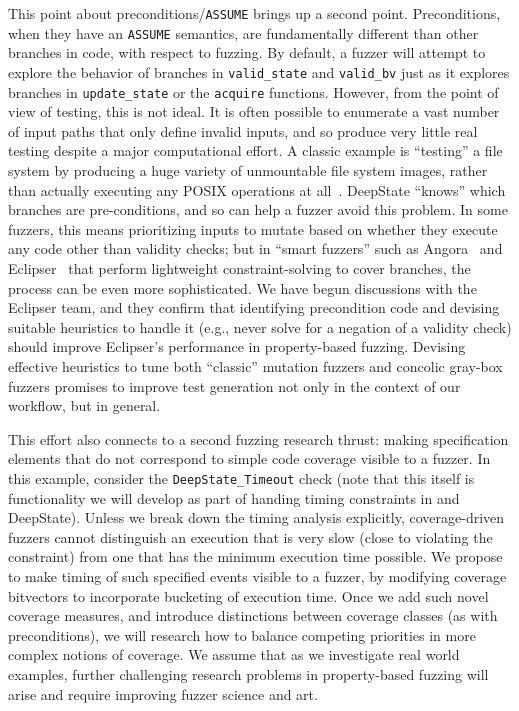   This point about preconditions/{\tt ASSUME} brings up a second point.  Preconditions, when they have an {\tt ASSUME} semantics, are fundamentally different than other branches in code, with respect to fuzzing.  By default, a fuzzer will attempt to explore the behavior of branches in {\tt valid\_state} and {\tt valid\_bv} just as it explores branches in {\tt update\_state} or the {\tt acquire} functions.  However, from the point of view of testing, this is not ideal.  It is often possible to enumerate a vast number of input paths that only define invalid inputs, and so produce very little real testing despite a major computational effort.  A classic example is ``testing'' a file system by producing a huge variety of unmountable file system images, rather than actually executing any POSIX operations at all~\cite{CFV08,AMAI}.  DeepState ``knows'' which branches are pre-conditions, and so can help a fuzzer avoid this problem.  In some fuzzers, this means prioritizing inputs to mutate based on whether they execute any code other than validity checks; but in ``smart fuzzers'' such as Angora~\cite{angora} and Eclipser~\cite{eclipser} that perform lightweight constraint-solving to cover branches, the process can be even more sophisticated.  We have begun discussions with the Eclipser team, and they confirm that identifying precondition code and devising suitable heuristics to handle it (e.g., never solve for a negation of a validity check) should improve Eclipser's performance in property-based fuzzing.  Devising effective heuristics to tune both ``classic'' mutation fuzzers and concolic gray-box fuzzers promises to improve test generation not only in the context of our workflow, but in general.

This effort also connects to a second fuzzing research thrust: making specification elements that do not correspond to simple code coverage visible to a fuzzer.  In this example, consider the {\tt DeepState\_Timeout} check (note that this itself is functionality we will develop as part of handing timing constraints in \framac and DeepState).  Unless we break down the timing analysis explicitly, coverage-driven fuzzers cannot distinguish an execution that is very slow (close to violating the constraint) from one that has the minimum execution time possible.  We propose to make timing of such specified events visible to a fuzzer, by modifying coverage bitvectors to incorporate bucketing of execution time.  Once we add such novel coverage measures, and introduce distinctions between coverage classes (as with preconditions), we will research how to balance competing priorities in more complex notions of coverage.  We assume that as we investigate real world examples, further challenging research problems in property-based fuzzing will arise and require improving fuzzer science and art.

